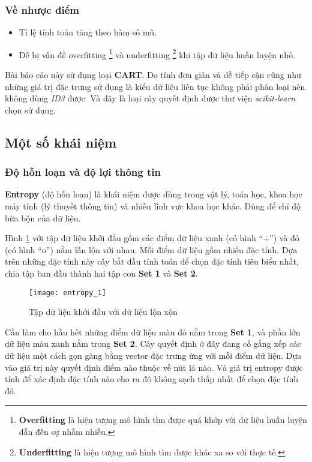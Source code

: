 \documentclass[../main-report.tex]{subfiles}
\begin{document}
\subsubsection*{Về nhược điểm}
\begin{itemize}
\item Tỉ lệ tính toán tăng theo hàm số mũ.
\item Dễ bị vấn đề overfitting \footnote{\textbf{Overfitting} là hiện tượng mô hình tìm được quá khớp với dữ liệu huấn luyện dẫn đến sự nhầm nhiễu.} và underfitting \footnote{\textbf{Underfitting} là hiện tượng mô hình tìm được khác xa so với thực tế.} khi tập dữ liệu huấn luyện nhỏ.
\end{itemize}

Bài báo cáo này sử dụng loại \textbf{CART}. Do tính đơn giản và dễ tiếp cận cũng như những giá trị đặc trưng sử dụng là kiểu dữ liệu liên tục không phải phân loại nên không dùng \emph{ID3} được. Và đây là loại cây quyết định được thư viện \textit{scikit-learn} chọn sử dụng.

\subsection{Một số khái niệm}
\subsubsection{Độ hỗn loạn và độ lợi thông tin}
\textbf{Entropy} (độ hỗn loạn) là khái niệm được dùng trong vật lý, toán học, khoa học máy tính (lý thuyết thông tin) và nhiều lĩnh vực khoa học khác. Dùng để chỉ độ bừa bộn của dữ liệu.

Hình \ref{fig:entropy_1} với tập dữ liệu khởi đầu gồm các điểm dữ liệu xanh (có hình ``+'') và đỏ (có hình ``o'') nằm lẫn lộn với nhau. Mỗi điểm dữ liệu gồm nhiều đặc tính. Dựa trên những đặc tính này cây bắt đầu tính toán để chọn đặc tính tiêu biểu nhất, chia tập ban đầu thành hai tập con \textbf{Set 1} và \textbf{Set 2}.

\begin{figure}[ht!]
\centering\texttt{[image: entropy\_1]}
\caption{Tập dữ liệu khởi đầu với dữ liệu lộn xộn}
\label{fig:entropy_1}
\end{figure}

Cần làm cho hầu hết những điểm dữ liệu màu đỏ nằm trong \textbf{Set 1}, và phần lớn dữ liệu màu xanh nằm trong \textbf{Set 2}. Cây quyết định ở đây đang cố gắng xếp các dữ liệu một cách gọn gàng bằng vector đặc trưng ứng với mỗi điểm dữ liệu. Dựa vào giá trị này quyết định điểm nào thuộc về nút lá nào. Và giá trị entropy được tính để xác định đặc tính nào cho ra độ không sạch thấp nhất để chọn đặc tính đó.
\end{document}
